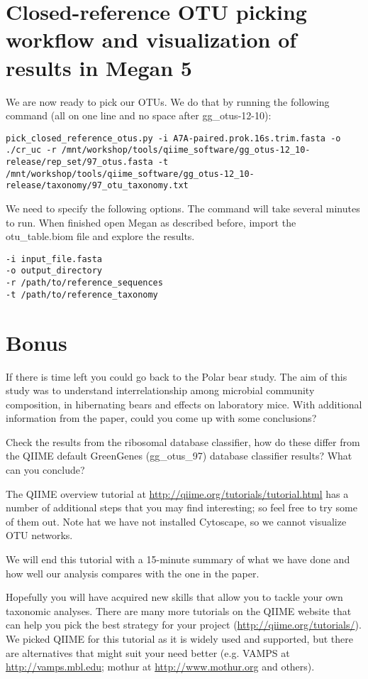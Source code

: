 \section{Closed-reference OTU picking workflow and visualization of results in Megan 5}
\begin{steps}
We are now ready to pick our OTUs. We do that by running the following command (all on one line and no space after gg\_otus-12-10):

\begin{lstlisting}
pick_closed_reference_otus.py -i A7A-paired.prok.16s.trim.fasta -o ./cr_uc -r /mnt/workshop/tools/qiime_software/gg_otus-12_10-release/rep_set/97_otus.fasta -t /mnt/workshop/tools/qiime_software/gg_otus-12_10-release/taxonomy/97_otu_taxonomy.txt
\end{lstlisting}
\end{steps}

\begin{steps}
We need to specify the following options. 
The command will take several minutes to run. When finished open Megan as described before, import the otu\_table.biom file and explore the results.

\begin{lstlisting}
-i input_file.fasta
-o output_directory
-r /path/to/reference_sequences
-t /path/to/reference_taxonomy

\end{lstlisting}
\end{steps}

\section{Bonus}

If there is time left you could go back to the Polar bear study. The aim of this study was to understand interrelationship among microbial community composition, in hibernating bears and effects on laboratory mice. With additional information from the paper, could you come up with some conclusions? 

Check the results from the ribosomal database classifier, how do these differ from the QIIME default GreenGenes (gg\_otus\_97) database classifier results? What can you conclude?

The QIIME overview tutorial at \url{http://qiime.org/tutorials/tutorial.html} has a number of additional steps that you may find interesting; so feel free to try some of them out. Note hat we have not installed Cytoscape, so we cannot visualize OTU networks.

We will end this tutorial with a 15-minute summary of what we have done and how well our analysis compares with the one in the paper.

Hopefully you will have acquired new skills that allow you to tackle your own taxonomic analyses. There are many more tutorials on the QIIME website that can help you pick the best strategy for your project (\url{http://qiime.org/tutorials/}). We picked QIIME for this tutorial as it is widely used and supported, but there are alternatives that might suit your need better (e.g. VAMPS at \url{http://vamps.mbl.edu}; mothur at \url{http://www.mothur.org} and others).


